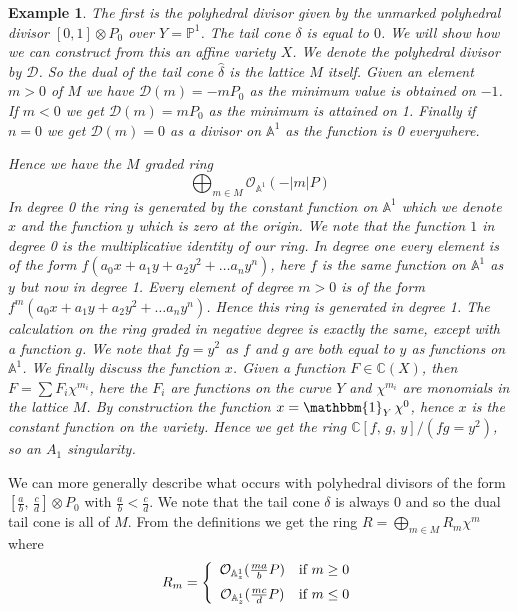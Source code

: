\documentclass[12pt,a4paper]{book}      %
\newtheorem{ex}[thm]{Example}
\newcommand{\mb}[1]{\mathbb{#1}}
\begin{document}
\begin{ex}\rm
The first is the polyhedral divisor given by the unmarked polyhedral divisor $[0, 1] \otimes P_0$ over $Y = \mb{P}^1$. 
The tail cone $\delta$ is equal to $0$. We will show how we can construct from this an affine variety $X$. We denote the polyhedral divisor by $\mathcal{D}$. So the dual of the tail cone $\hat{\delta}$ is the lattice $M$ itself. Given an element $ m >0$ of $M$ we have $\mathcal{D}(m) = -mP_0$ as the minimum value is obtained on $-1$. If $m <0$ we get $\mathcal{D}(m) = mP_0$  as the minimum is attained on 1. Finally if $n=0$ we get $\mathcal{D}(m) = 0$ as a divisor on $\mathbb{A}^1$ as the function is 0 everywhere. 


Hence we have the $M$ graded ring
\[
\bigoplus_{m \in M} \mathcal{O}_{\mathbb{A}^1}(-|m|P)
\]
In degree 0 the ring is generated by the constant function on $\mb{A}^1$ which we denote $x$ and the function $y$ which is zero at the origin. We note that the function $1$ in degree 0 is the multiplicative identity of our ring. In degree one every element is of the form $f ( a_0 x + a_1 y + a_2 y^2 + \dots  a_n y^n)$, here $f$ is the same function on $\mb{A}^1$ as $y$ but now in degree 1. Every element of degree $m>0$ is of the form $f^m ( a_0 x + a_1 y + a_2 y^2 + \dots  a_n y^n)$. Hence this ring is generated in degree 1. The calculation on the ring graded in negative degree is exactly the same, except with a function $g$.  We note that $fg = y^2$ as $f$ and $g$ are both equal to $y$ as functions on $\mb{A}^1$. We finally discuss the function $x$. Given a function $F \in \mb{C}(X)$, then $F = \sum F_i \chi^{m_i}$, here the $F_i$ are functions on the curve $Y$ and $\chi^{m_i}$ are monomials in the lattice $M$. By construction the function $x = \mathbbm{1}_{Y} \, \chi^0$, hence $x$ is the constant function on the variety. Hence we get the ring $\mathbb{C}[f,  \, g, \, y]/ (fg=y^2)$, so an $A_1$ singularity.
\end{ex}

We can more generally describe what occurs with polyhedral divisors of the form $[\frac{a}{b}, \, \frac{c}{d}] \otimes P_0$ with $\frac{a}{b} < \frac{c}{d}$. We note that the tail cone $\delta$ is always 0 and so the dual tail cone is all of $M$. From the definitions we get the ring $R = \bigoplus_{m \in M} R_m \chi^m$ where
\[
R_m = 
\left\{
\begin{array}{cc}
\mathcal{O}_{\mb{A}_z^1} ( \frac{ma}{b}P) & \text{if } m \geq 0  \vspace{0.2cm} \\
\mathcal{O}_{\mb{A}_z^1} ( \frac{mc}{d}P) & \text{if } m \leq 0 
\end{array}
\right.
\]
\end{document}
